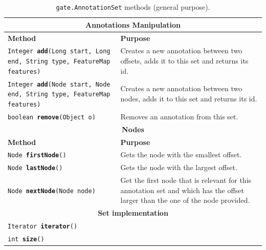 \begin{table}[htbp]
\begin{small}
\begin{center}
\begin{tabular}{|p{}|p{}|}
\hline
\multicolumn{2}{|c|}{\textbf{Annotations Manipulation}}\\
\hline
\hline
\textbf{Method} & \textbf{Purpose}\\
\hline
{\tt Integer {\bf add}(Long start, Long end, String type, FeatureMap features)}
& Creates a new annotation between two offsets, adds it to this set and returns its id.\\
\hline
{\tt Integer {\bf add}(Node start, Node end, String type, FeatureMap
features)} & Creates a new annotation between two nodes, adds it to this
set and returns its id.\\
\hline
{\tt boolean {\bf remove}(Object o)} & Removes an annotation from this
set.\\
\hline

\multicolumn{2}{|c|}{\textbf{Nodes}}\\
\hline
\hline
\textbf{Method} & \textbf{Purpose}\\
\hline
{\tt Node {\bf firstNode}()} & Gets the node with the smallest offset.\\
\hline
{\tt Node {\bf lastNode}()} & Gets the node with the largest offset.\\
\hline
{\tt Node {\bf nextNode}(Node node)} & Get the first node that is relevant
for this annotation set and which has the offset larger than the one of the
node provided.\\
\hline
\multicolumn{2}{|c|}{\textbf{Set implementation}}\\
\hline
\hline
{\tt Iterator {\bf iterator}() } & \\
\hline
{\tt int {\bf size}()} & \\
\hline
\end{tabular}
\caption{{\tt gate.AnnotationSet} methods (general purpose).}
\label{table:annSet1}
\end{center}
\end{small}
\end{table}


